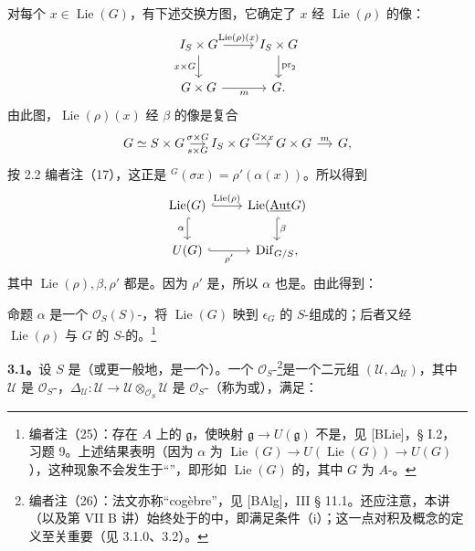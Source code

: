 对每个 $x\in\operatorname{Lie}(G)$，有下述交换方图，它确定了 $x$ 经 $\operatorname{Lie}(\rho)$ 的像：
\[
\begin{tikzcd}
I_S\times G\arrow[r,"\operatorname{Lie}(\rho)(x)"]\arrow[d,"x\times G"']&I_S\times G\arrow[d,"\operatorname{pr}_2"]\\
G\times G\arrow[r,"m"']&G.
\end{tikzcd}
\]
由此图，$\operatorname{Lie}(\rho)(x)$ 经 $\beta$ 的像是复合
\[
\begin{tikzcd}[column sep=small]
G\simeq S\times G\arrow[r,"\sigma\times G","s\times G"']&I_S\times G\arrow[r,"G\times x"]&G\times G\arrow[r,"m"]&G,
\end{tikzcd}
\]
按 2.2 编者注（17），这正是 ${}^G(\sigma x)=\rho'(\alpha(x))$。所以得到
\[
\begin{tikzcd}
\operatorname{Lie}(G)\arrow[r,hook,"\operatorname{Lie}(\rho)"]\arrow[d,hook,"\alpha"']&\operatorname{Lie}(\underline{\operatorname{Aut}}G)\arrow[d,hook,"\beta"]\\
U(G)\arrow[r,hook,"\rho'"']&\operatorname{Dif}_{G/S},
\end{tikzcd}
\]
其中 $\operatorname{Lie}(\rho),\beta,\rho'$ 都是。因为 $\rho'$ 是，所以 $\alpha$ 也是。由此得到：
\begin{SGAresult}{命题}{}
$\alpha$ 是一个 $\mathcal O_S(S)$-，将 $\operatorname{Lie}(G)$ 映到 $\epsilon_G$ 的 $S$-组成的；后者又经 $\operatorname{Lie}(\rho)$ 与 $G$ 的 $S$-的。\footnote{编者注（25）：存在 $A$ 上的 $\mathfrak g$，使映射 $\mathfrak g\to U(\mathfrak g)$ 不是，见 [BLie]，§ I.2，习题 9。上述结果表明（因为 $\alpha$ 为 $\operatorname{Lie}(G)\to U(\operatorname{Lie}(G))\to U(G)$），这种现象不会发生于“”，即形如 $\operatorname{Lie}(G)$ 的，其中 $G$ 为 $A$-。}
\end{SGAresult}

\textbf{3.1。}设 $S$ 是（或更一般地，是一个）。一个 $\mathcal O_S$-\footnote{编者注（26）：法文亦称“cogèbre”，见 [BAlg]，III § 11.1。还应注意，本讲（以及第 VII B 讲）始终处于的中，即满足条件（i）；这一点对积及概念的定义至关重要（见 3.1.0、3.2）。}是一个二元组 $(\mathcal U,\Delta_{\mathcal U})$，其中 $\mathcal U$ 是 $\mathcal O_S$-，$\Delta_{\mathcal U}:\mathcal U\to\mathcal U\otimes_{\mathcal O_S}\mathcal U$ 是 $\mathcal O_S$-（称为或），满足：

